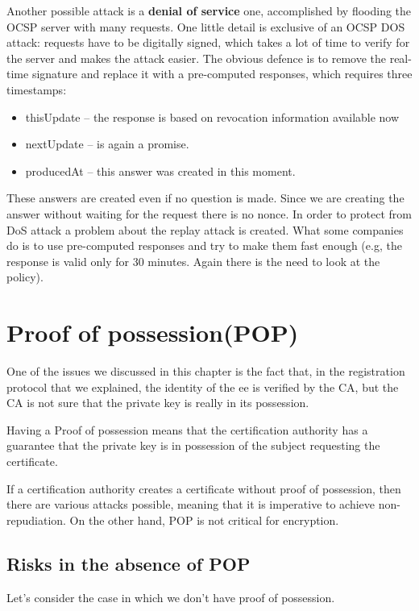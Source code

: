 Another possible attack is a \textbf{denial of service} one,
accomplished by flooding the OCSP server with many requests. One
little detail is exclusive of an OCSP DOS attack: requests have to be
digitally signed, which takes a lot of time to verify for the server
and makes the attack easier. The obvious defence is to remove the
real-time signature and replace it with a pre-computed responses,
which requires three timestamps:
\begin{itemize}
  \item thisUpdate – the response is based on revocation information
    available now
  \item nextUpdate – is again a promise.
  \item producedAt – this answer was created in this moment.
\end{itemize}
These answers are created even if no question is made. Since we are
creating the answer without waiting for the request there is no nonce.
In order to protect from DoS attack a problem about the replay attack
is created. What some companies do is to use pre-computed responses
and try to make them fast enough (e.g, the response is valid only for
30 minutes. Again there is the need to look at the policy).

\section{Proof of possession(POP)}
One of the issues we discussed in this chapter is the fact that, in
the registration protocol that we explained, the identity of the ee is 
verified by the CA, but the CA is not sure that the private key is 
really in its possession.

\begin{boxH}
  Having a Proof of possession means that the certification authority
  has a guarantee that the private key is in possession of the subject
  requesting the certificate.
\end{boxH}
If a certification authority creates a certificate without proof of
possession, then there are various attacks possible, meaning that it
is imperative to achieve non-repudiation. On the other hand, POP is
not critical for encryption.
\subsection{Risks in the absence of POP}
Let's consider the case in which we don't have proof of possession.

